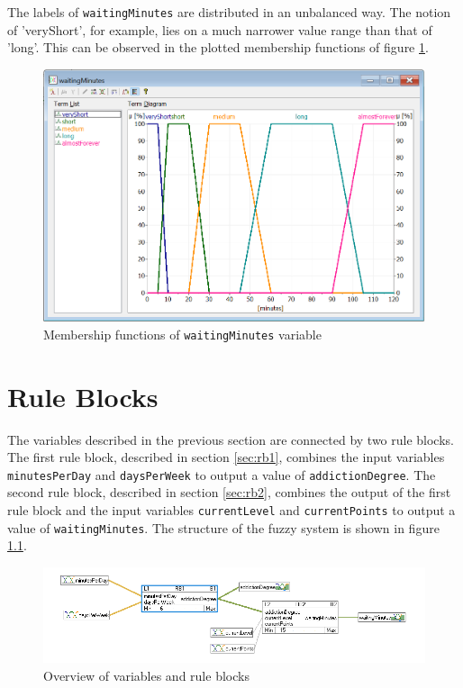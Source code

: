 The labels of \texttt{waitingMinutes} are distributed in an unbalanced way. The notion of 'veryShort', for example, lies on a much narrower value range than that of 'long'. This can be observed in the plotted membership functions of figure \ref{fig:waitingMinutes}.

\begin{figure}[H]
\centering
\includegraphics[width=\textwidth]{img/vWaitingMinutes}
\caption{Membership functions of \texttt{waitingMinutes} variable}
\label{fig:waitingMinutes} 
\end{figure}

\chapter{Rule Blocks}
\label{cha:rb}

The variables described in the previous section are connected by two rule blocks. The first rule block, described in section \ref{sec:rb1}, combines the input variables \texttt{minutesPerDay} and \texttt{daysPerWeek} to output a value of \texttt{addictionDegree}. The second rule block, described in section \ref{sec:rb2}, combines the output of the first rule block and the input variables \texttt{currentLevel} and \texttt{currentPoints} to output a value of \texttt{waitingMinutes}. The structure of the fuzzy system is shown in figure \ref{fig:all}.

\begin{figure}[H]
\centering
\includegraphics[width=\textwidth]{img/all}
\caption{Overview of variables and rule blocks}
\label{fig:all} 
\end{figure}

